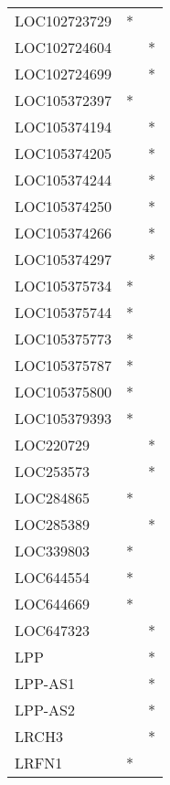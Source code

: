 \begin{longtable}{lcc}
LOC102723729     &              * &            \\
LOC102724604     &                &          * \\
LOC102724699     &                &          * \\
LOC105372397     &              * &            \\
LOC105374194     &                &          * \\
LOC105374205     &                &          * \\
LOC105374244     &                &          * \\
LOC105374250     &                &          * \\
LOC105374266     &                &          * \\
LOC105374297     &                &          * \\
LOC105375734     &              * &            \\
LOC105375744     &              * &            \\
LOC105375773     &              * &            \\
LOC105375787     &              * &            \\
LOC105375800     &              * &            \\
LOC105379393     &              * &            \\
LOC220729        &                &          * \\
LOC253573        &                &          * \\
LOC284865        &              * &            \\
LOC285389        &                &          * \\
LOC339803        &              * &            \\
LOC644554        &              * &            \\
LOC644669        &              * &            \\
LOC647323        &                &          * \\
LPP              &                &          * \\
LPP-AS1          &                &          * \\
LPP-AS2          &                &          * \\
LRCH3            &                &          * \\
LRFN1            &              * &            \\

\end{longtable}
